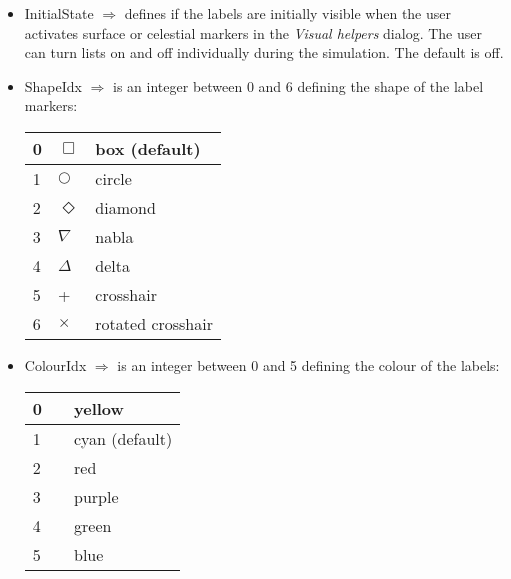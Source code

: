 \documentclass[Orbiter Developer Manual.tex]{subfiles}
\begin{document}
\begin{itemize}
\item InitialState $\Rightarrow$ defines if the labels are initially visible when the user activates surface or celestial markers in the \textit{Visual helpers} dialog. The user can turn lists on and off individually during the simulation. The default is off.
\item ShapeIdx $\Rightarrow$ is an integer between 0 and 6 defining the shape of the label markers:

	\begin{longtable}{ |p{}|p{}|p{}| }
	\hline\rule{0pt}{2ex}
	0 & $\Box$ & box (default)\\
	\hline\rule{0pt}{2ex}
	1 & $\bigcirc$ & circle\\
	\hline\rule{0pt}{2ex}
	2 & $\Diamond$ & diamond\\
	\hline\rule{0pt}{2ex}
	3 & $\nabla$ & nabla\\
	\hline\rule{0pt}{2ex}
	4 & $\Delta$ & delta\\
	\hline\rule{0pt}{2ex}
	5 & + & crosshair\\
	\hline\rule{0pt}{2ex}
	6 & $\times$ & rotated crosshair\\
	\hline
	\end{longtable}

\item ColourIdx $\Rightarrow$ is an integer between 0 and 5 defining the colour of the labels:

	\begin{longtable}{ |p{}|p{}|p{}| }
	\hline\rule{0pt}{2ex}
	0 & \cellcolor[HTML]{FFFF00} & yellow\\
	\hline\rule{0pt}{2ex}
	1 & \cellcolor[HTML]{00FFFF} & cyan (default)\\
	\hline\rule{0pt}{2ex}
	2 & \cellcolor[HTML]{FF3F3F} & red\\
	\hline\rule{0pt}{2ex}
	3 & \cellcolor[HTML]{FF00FF} & purple\\
	\hline\rule{0pt}{2ex}
	4 & \cellcolor[HTML]{3FFF3F} & green\\
	\hline\rule{0pt}{2ex}
	5 & \cellcolor[HTML]{007FFF} & blue\\
	\hline
	\end{longtable}


\end{itemize}
\end{document}
